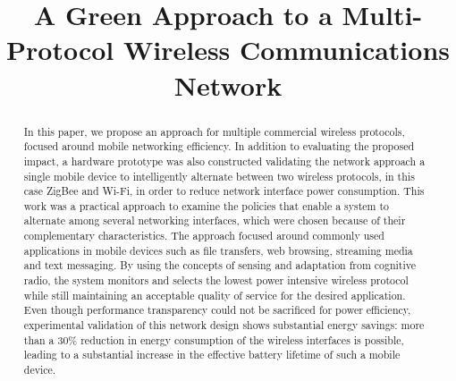 \documentclass[conference]{IEEEtran}
\begin{document}
\title{A Green Approach to a Multi-Protocol Wireless Communications Network}


\author{
}




\maketitle


\begin{abstract}
In this paper, we propose an approach for multiple commercial wireless protocols, focused around mobile networking efficiency.  In addition to evaluating the proposed impact, a hardware prototype was also constructed validating the network approach a single mobile device to intelligently alternate between two wireless protocols, in this case ZigBee and Wi-Fi, in order to reduce network interface power consumption.   This work was a practical approach to examine the policies that enable a system to alternate among several networking interfaces, which were chosen because of their complementary characteristics.  The approach focused around commonly used applications in mobile devices such as file transfers, web browsing, streaming media and text messaging.  By using the concepts of sensing and adaptation from cognitive radio, the system monitors and selects the lowest power intensive wireless protocol while still maintaining an acceptable quality of service for the desired application.  Even though performance transparency could not be sacrificed for power efficiency, experimental validation of this network design shows substantial energy savings: more than a 30\% reduction in energy consumption of the wireless interfaces is possible, leading to a substantial increase in the effective battery lifetime of such a mobile device.
\end{abstract}
\end{document}
